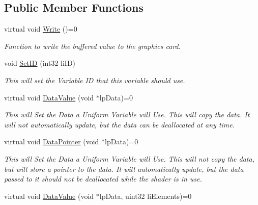 \subsection*{Public Member Functions}
\begin{DoxyCompactItemize}
\item 
\hypertarget{classc_user_variable_abedb589d4c0dad6373f9afef2f34b3f0}{
virtual void \hyperlink{classc_user_variable_abedb589d4c0dad6373f9afef2f34b3f0}{Write} ()=0}
\label{classc_user_variable_abedb589d4c0dad6373f9afef2f34b3f0}

\begin{DoxyCompactList}\small\item\em Function to write the buffered value to the graphics card. \end{DoxyCompactList}\item 
\hypertarget{classc_user_variable_a155dc1766d4de63ee155fc1593da44ca}{
void \hyperlink{classc_user_variable_a155dc1766d4de63ee155fc1593da44ca}{SetID} (int32 liID)}
\label{classc_user_variable_a155dc1766d4de63ee155fc1593da44ca}

\begin{DoxyCompactList}\small\item\em This will set the Variable ID that this variable should use. \end{DoxyCompactList}\item 
\hypertarget{classc_user_variable_a96118fa5cffd62b3b9d2c3124eaea411}{
virtual void \hyperlink{classc_user_variable_a96118fa5cffd62b3b9d2c3124eaea411}{DataValue} (void $\ast$lpData)=0}
\label{classc_user_variable_a96118fa5cffd62b3b9d2c3124eaea411}

\begin{DoxyCompactList}\small\item\em This will Set the Data a Uniform Variable will Use. This will copy the data. It will not automatically update, but the data can be deallocated at any time. \end{DoxyCompactList}\item 
\hypertarget{classc_user_variable_a37a73c2e04f393f3c53bd81c7c58bacc}{
virtual void \hyperlink{classc_user_variable_a37a73c2e04f393f3c53bd81c7c58bacc}{DataPointer} (void $\ast$lpData)=0}
\label{classc_user_variable_a37a73c2e04f393f3c53bd81c7c58bacc}

\begin{DoxyCompactList}\small\item\em This will Set the Data a Uniform Variable will Use. This will not copy the data, but will store a pointer to the data. It will automatically update, but the data passed to it should not be deallocated while the shader is in use. \end{DoxyCompactList}\item 
\hypertarget{classc_user_variable_a16850159182c5c65848a733d3ac99dcd}{
virtual void \hyperlink{classc_user_variable_a16850159182c5c65848a733d3ac99dcd}{DataValue} (void $\ast$lpData, uint32 liElements)=0}
\label{classc_user_variable_a16850159182c5c65848a733d3ac99dcd}


\end{DoxyCompactItemize}
